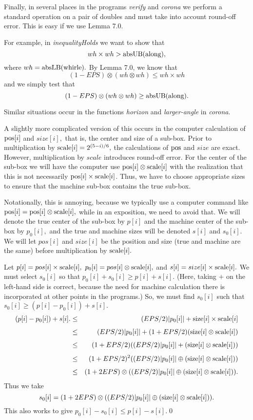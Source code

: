 Finally, in several places in the programs {\it verify} and {\it corona} we perform a standard operation on a pair of doubles and must take into account round-off error.  This is easy if we use Lemma 7.0.

For example, in {\it inequalityHolds} we want to show that $$wh \times wh  > {\rm absUB}{\rm (along),}$$ where $wh =
{\rm absLB}{\rm (whirle)}.$   
By Lemma 7.0, we know that $$(1 - EPS) \otimes (wh \otimes wh) \le wh \times wh$$ and we simply test that 
$$(1 - EPS) \otimes  (wh \otimes wh) \ge {\rm absUB}{\rm (along)}.$$

Similar situations occur in the functions {\it horizon} and {\it larger\/{\rm -}\/angle} in {\it corona}.

A slightly more complicated version of this occurs in the computer calculation of ${\rm pos}[i]$ and $size[i],$ that is, the center and size of a sub-box.  Prior to multiplication by ${\rm scale}[i] = 2 ^{(5 - i)/6},$  the calculations of ${\rm pos}$ and $size$ are exact.  However, multiplication by $scale$ introduces round-off error.  For the center of the sub-box we will have the computer use ${\rm pos}[i] \otimes {\rm scale}[i]$ with the realization that this is not necessarily ${\rm pos}[i] \times {\rm scale}[i]$.   Thus, we have to choose appropriate sizes to ensure that the machine sub-box contains the true sub-box.  

Notationally, this is annoying, because we typically use a computer command like ${\rm pos}[i] = {\rm pos}[i] \otimes {\rm scale}[i],$ while in an exposition, we need to avoid that.  We will denote the true center of the sub-box by $p[i]$ and the machine center of the sub-box by $p_0[i],$ and the true and machine sizes will be denoted $s[i]$ and $s_0[i].$  We will let $pos[i]$ and $size[i]$ be the position and size (true and machine are the same) before multiplication by ${\rm scale}[i].$

Let $p[i] = pos[i] \times {\rm scale}[i],\ p_0[i] = pos[i] \otimes {\rm scale}[i],$ and 
$s[i]= size[i] \times {\rm scale}[i].$  We must select $s_0[i]$ so that 
$p_0[i] + s_0[i] \ge p[i] + s[i].$  (Here, taking $+$ on the left-hand side is correct, because the need for machine calculation there is incorporated at other points in the programs.)  So, we must find $s_0[i]$ such that $s_0[i] \ge (p[i] - p_0[i]) + s[i].$
\begin{eqnarray*}
(p[i] - p_0[i]) + s[i]. &\le& (EPS/2) |p_0[i]| + {\rm size}[i] \times {\rm scale}[i]\\[4pt]
&\le& (EPS/2) |p_0[i]| + (1 + EPS/2) ({\rm size}[i] \otimes
{\rm scale}[i])\\[4pt]
&\le& (1 + EPS/2) ((EPS/2) |p_0[i]| +  ({\rm size}[i] \otimes {\rm scale}[i]))\\[4pt]
&\le& (1 + EPS/2)^2 ((EPS/2) |p_0[i]| \oplus  ({\rm size}[i]
\otimes {\rm scale}[i]))\\[4pt]
&\le& (1 + 2EPS) \otimes ((EPS/2) |p_0[i]| \oplus  ({\rm size}[i] \otimes {\rm scale}[i])).
\end{eqnarray*}
Thus we take 
$$s_0 [i]= (1 + 2EPS) \otimes ((EPS/2) |p_0[i]| \oplus  ({\rm size}[i] \otimes {\rm scale}[i])).$$
This also works to give $p_0[i] - s_0[i] \le p[i] - s[i].$\hfill\qed


 




